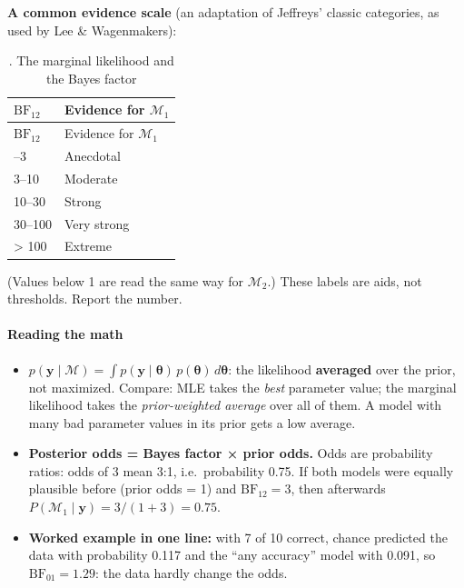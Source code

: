 \textbf{A common evidence scale} (an adaptation of Jeffreys' classic
categories, as used by Lee \& Wagenmakers):

\begin{longtable}[]{@{}ll@{}}
\caption{. The marginal likelihood and the Bayes factor}\tabularnewline
\toprule\noalign{}
\(\mathrm{BF}_{12}\) & Evidence for \(\mathcal{M}_1\) \\
\midrule\noalign{}
\endfirsthead
\toprule\noalign{}
\(\mathrm{BF}_{12}\) & Evidence for \(\mathcal{M}_1\) \\
\midrule\noalign{}
\endhead
\bottomrule\noalign{}
\endlastfoot
1--3 & Anecdotal \\
3--10 & Moderate \\
10--30 & Strong \\
30--100 & Very strong \\
\textgreater{} 100 & Extreme \\
\end{longtable}

(Values below 1 are read the same way for \(\mathcal{M}_2\).) These
labels are aids, not thresholds. Report the number.

\paragraph{Reading the math}

\begin{itemize}
\tightlist
\item
  \(p(\mathbf{y} \mid \mathcal{M}) = \int p(\mathbf{y} \mid \boldsymbol\theta)\,p(\boldsymbol\theta)\,d\boldsymbol\theta\):
  the likelihood \textbf{averaged} over the prior, not maximized.
  Compare: MLE takes the \emph{best} parameter value; the marginal
  likelihood takes the \emph{prior-weighted average} over all of them. A
  model with many bad parameter values in its prior gets a low average.
\item
  \textbf{Posterior odds = Bayes factor × prior odds.} Odds are
  probability ratios: odds of 3 mean 3:1, i.e.~probability 0.75. If both
  models were equally plausible before (prior odds = 1) and
  \(\mathrm{BF}_{12} = 3\), then afterwards
  \(P(\mathcal{M}_1 \mid \mathbf{y}) = 3/(1+3) = 0.75\).
\item
  \textbf{Worked example in one line:} with 7 of 10 correct, chance
  predicted the data with probability 0.117 and the ``any accuracy''
  model with 0.091, so \(\mathrm{BF}_{01} = 1.29\): the data hardly
  change the odds.
\end{itemize}

